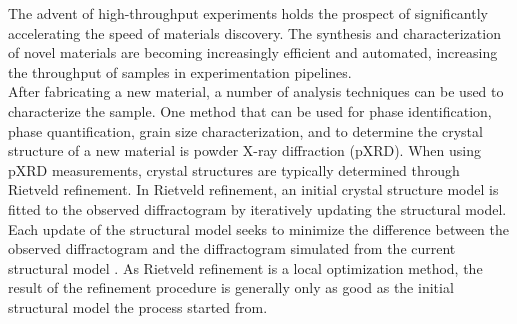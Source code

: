 The advent of high-throughput experiments holds the prospect of significantly accelerating the speed of materials discovery\cite{Liu2019}. The synthesis and characterization of novel materials are becoming increasingly efficient and automated, increasing the throughput of samples in experimentation pipelines\cite{MacLeod2019, Ludwig2019, Ozaki2020}. \\

After fabricating a new material, a number of analysis techniques can be used to characterize the sample. One method that can be used for phase identification, phase quantification, grain size characterization, and to determine the crystal structure of a new material is powder X-ray diffraction (pXRD). 
When using pXRD measurements, crystal structures are typically determined through Rietveld refinement. In Rietveld refinement, an initial crystal structure model is fitted to the observed diffractogram by iteratively updating the structural model. Each update of the structural model seeks to minimize the difference between the observed diffractogram and the diffractogram simulated from the current structural model \cite{Dinnebier2019, Cano2021}. As Rietveld refinement is a local optimization method, the result of the refinement procedure is generally only as good as the initial structural model the process started from. \\

